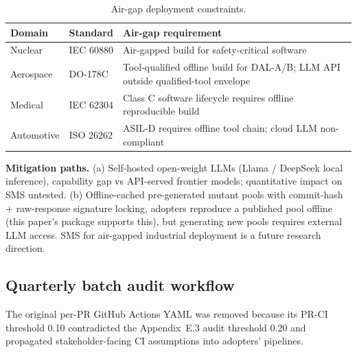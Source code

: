 \documentclass[manuscript,screen,review]{acmart}
\begin{document}
{%
\begin{longtable}[]{@{}
  >{\raggedright\arraybackslash}p{}
  >{\raggedright\arraybackslash}p{}
  >{\raggedright\arraybackslash}p{}@{}}
\caption{Air-gap deployment constraints.}\label{tab:p2-25}\\
\toprule\noalign{}
\begin{minipage}[b]{\linewidth}\raggedright
Domain
\end{minipage} & \begin{minipage}[b]{\linewidth}\raggedright
Standard
\end{minipage} & \begin{minipage}[b]{\linewidth}\raggedright
Air-gap requirement
\end{minipage} \\
\midrule\noalign{}
\endfirsthead
\endhead
\bottomrule\noalign{}
\endlastfoot
Nuclear & IEC 60880 & Air-gapped build for safety-critical software \\
Aerospace & DO-178C & Tool-qualified offline build for DAL-A/B; LLM API
outside qualified-tool envelope \\
Medical & IEC 62304 & Class C software lifecycle requires offline
reproducible build \\
Automotive & ISO 26262 & ASIL-D requires offline tool chain; cloud LLM
non-compliant \\
\end{longtable}
}

\textbf{Mitigation paths.} (a) Self-hosted open-weight LLMs (Llama
/ DeepSeek local inference), capability gap vs API-served frontier
models; quantitative impact on SMS untested. (b) Offline-cached
pre-generated mutant pools with commit-hash + raw-response signature
locking, adopters reproduce a published pool offline (this paper's
package supports this), but generating new pools requires external LLM
access. SMS for air-gapped industrial deployment is a future research
direction.

\subsection{Quarterly batch audit workflow}\label{e.2-quarterly-batch-audit-workflow}

The original per-PR GitHub Actions YAML was removed because its PR-CI
threshold 0.10 contradicted the Appendix~E.3 audit threshold 0.20 and propagated
stakeholder-facing CI assumptions into adopters' pipelines.
\end{document}
